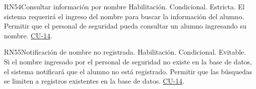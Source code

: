 \begin{BussinesRule}{RN54}{Consultar información por nombre}
    \BRitem[Tipo:] Habilitación.
    \BRitem[Clase:] Condicional.
    \BRitem[Nivel:] Estricta.
    \BRitem[Descripción:] El sistema requerirá el ingreso del nombre para buscar la información del alumno.
    \BRitem[Motivación:] Permitir que el personal de seguridad pueda consultar un alumno ingresando su nombre. 
     \hyperlink{CU-14}{CU-14}.
    \end{BussinesRule}

\begin{BussinesRule}{RN55}{Notificación de nombre no registrada.}
    \BRitem[Tipo:] Habilitación.
    \BRitem[Clase:] Condicional.
    \BRitem[Nivel:] Evitable.
    \BRitem[Descripción:] Si el nombre ingresado por el personal de seguridad no existe en la base de datos, el sistema notificará que el alumno no está registrado.
    \BRitem[Motivación:] Permitir que las búsquedas se limiten a registros existentes en la base de datos.
     \hyperlink{CU-14}{CU-14}.
    \end{BussinesRule}





	




